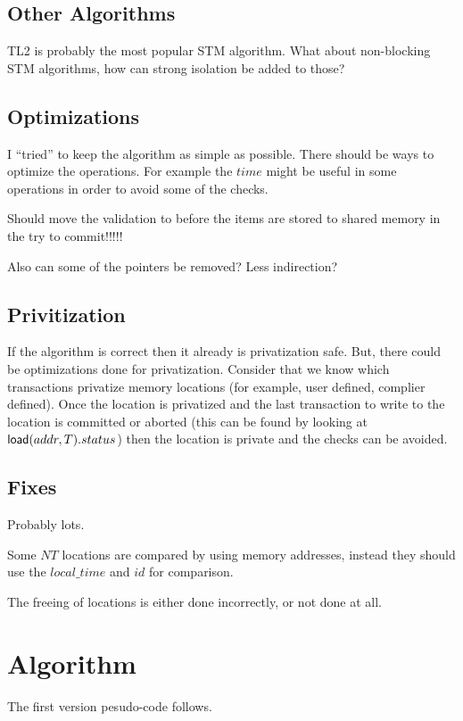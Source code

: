 \documentclass[11pt]{article}
\begin{document}
\subsection{Other Algorithms}
TL2 is probably the most popular STM algorithm.
What about non-blocking STM algorithms, how can strong isolation be added to those?

\subsection{Optimizations}
I ``tried'' to keep the algorithm as simple as possible.
There should be ways to optimize the operations.
For example the $time$ might be useful in some operations
in order to avoid some of the checks.


Should move the validation to before the items are stored to shared memory in the try to commit!!!!!

Also can some of the pointers be removed?
Less indirection?

\subsection{Privitization}
If the algorithm is correct then it already is privatization safe.
But, there could be optimizations done for privatization.
Consider that we know which transactions privatize memory locations (for example, user defined, complier defined).
Once the location is privatized and the last transaction to write to the location
is committed or aborted (this can be found by looking at ${\sf load}(addr, T).status$)
then the location is private and the checks can be avoided.

\subsection{Fixes}
Probably lots.

Some $NT$ locations are compared by using memory addresses, instead they should use the $local\_time$ and $id$ for comparison.

The freeing of locations is either done incorrectly, or not done at all.

\section{Algorithm}
The first version pesudo-code follows.
\end{document}
